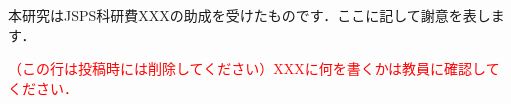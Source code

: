 \begin{ack}
本研究はJSPS科研費XXXの助成を受けたものです．ここに記して謝意を表します．

\textcolor{red}{（この行は投稿時には削除してください）XXXに何を書くかは教員に確認してください．}
\end{ack}
